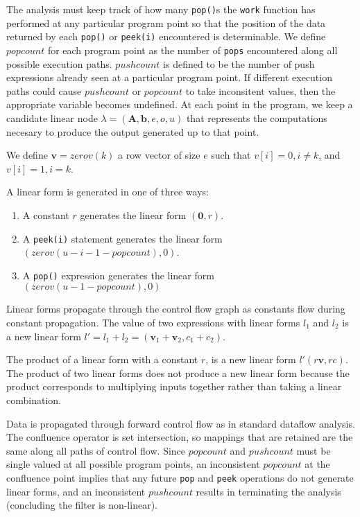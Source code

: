 The analysis must keep track of how many {\tt pop()}s the {\tt work} 
function has performed at any particular program point so that 
the position of the data returned by each {\tt pop()} or {\tt peek(i)} 
encountered is determinable. We define $popcount$ for each program point 
as the number of {\tt pops} encountered along all possible
execution paths. 
$pushcount$ is defined to be the number of push expressions already
seen at a particular program point.
If different execution paths could cause $pushcount$ or 
$popcount$ to take inconsitent values, then the appropriate
variable becomes undefined.
At each point in the program, we keep a candidate linear node 
$\lambda=({\mathbf A}, {\mathbf b}, e,o,u)$ that represents the 
computations necesary to produce the output generated up to that 
point.

We define ${\mathbf v} = zerov(k)$ a row vector of size $e$ such that 
$v[i]=0, i \neq k$, and $v[i]=1,i=k$.

A linear form is generated in one of three ways:

\begin{enumerate}
\item A constant $r$ generates the linear form $({\mathbf 0},r)$. 
\vspace{-6pt}

\item A {\tt peek(i)} statement generates the linear form 
$(zerov(u-i-1-popcount), 0)$.
\vspace{-6pt}

\item A {\tt pop()} expression generates the linear form 
$(zerov(u-1-popcount),0)$

\end{enumerate}

Linear forms propagate through the control flow graph as constants flow
during constant propagation. The value of two expressions with linear forms $l_1$ 
and $l_2$ is a new linear form $l'=l_1+l_2=({\mathbf v}_1+{\mathbf v}_2, c_1+c_2)$.

The product of a linear form with a constant $r$, is a new linear form 
$l' (r{\mathbf v},rc)$. The product of two linear forms does not produce a 
new linear form because the product corresponds to multiplying inputs together 
rather than taking a linear combination. 

Data is propagated through forward control flow as in standard dataflow analysis. 
The confluence operator is set intersection, so mappings that are retained are the same 
along all paths of control flow. Since $popcount$ and $pushcount$ must be single
valued at all possible program points, an inconsistent $popcount$ at the
confluence point implies that any future {\tt pop} and {\tt peek} operations
do not generate linear forms, and an inconsistent $pushcount$ results in
terminating the analysis (concluding the filter is non-linear).

